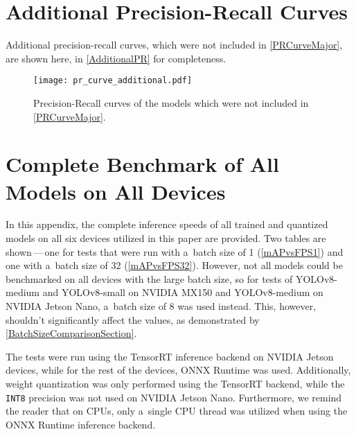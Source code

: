 \begin{appendices}
\label{Appendix} %


\chapter{Additional Precision-Recall Curves}
\label{PRCurvesAdditional}

Additional precision-recall curves, which were not included in
\autoref{PRCurveMajor}, are shown here, in \autoref{AdditionalPR} for
completeness.

\begin{figure}[H]
        \centering
        \texttt{[image: pr\_curve\_additional.pdf]}
        \caption{Precision-Recall curves of the models which were not included
        in \autoref{PRCurveMajor}.}
        \label{AdditionalPR}
\end{figure}


\chapter{Complete Benchmark of All Models on All Devices}
\label{mAPvsFPS}

In this appendix, the complete inference speeds of all trained and quantized
models on all six devices utilized in this paper are provided. Two tables are
shown\,---\,one for tests that were run with a~batch size of 1
(\autoref{mAPvsFPS1}) and one with a~batch size of 32 (\autoref{mAPvsFPS32}).
However, not all models could be benchmarked on all devices with the large batch
size, so for tests of YOLOv8-medium and YOLOv8-small on NVIDIA MX150 and
YOLOv8-medium on NVIDIA Jetson Nano, a~batch size of 8 was used instead. This,
however, shouldn't significantly affect the values, as demonstrated by
\autoref{BatchSizeComparisonSection}.

The tests were run using the TensorRT inference backend on NVIDIA Jetson
devices, while for the rest of the devices, ONNX Runtime was used. Additionally,
weight quantization was only performed using the TensorRT backend, while the
\texttt{INT8} precision was not used on NVIDIA Jetson Nano. Furthermore, we
remind the reader that on CPUs, only a~single CPU thread was utilized when using
the ONNX Runtime inference backend.


\end{appendices}
